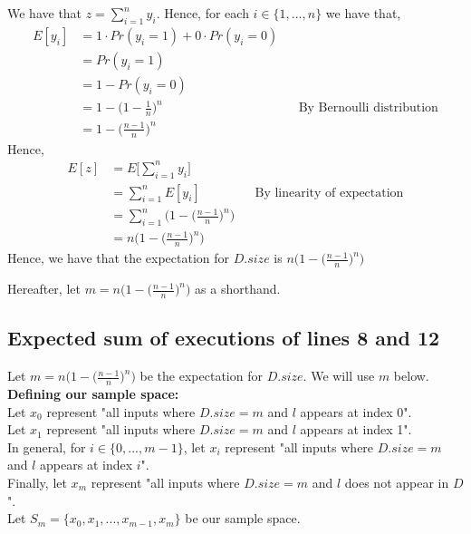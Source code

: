 \documentclass[12pt]{article}
\begin{document}
We have that $z = \sum\limits_{i=1}^n y_i$. Hence, for each $i \in \{1,...,n\}$ we have that,
\begin{align*}
E[y_i] &= 1 \cdot Pr(y_i = 1) + 0 \cdot Pr(y_i = 0) \\
&= Pr(y_i = 1) \\
&= 1 - Pr(y_i = 0) \\
&= 1 - \Big(1 - \frac{1}{n}\Big)^n &&\text{By Bernoulli distribution} \\
&= 1 - \Big(\frac{n-1}{n}\Big)^n
\end{align*}
Hence, 
\begin{align*}
E[z] &= E\Big[\sum_{i=1}^n y_i\Big] \\
&= \sum_{i=1}^n E[y_i] &&\text{By linearity of expectation} \\
&= \sum_{i=1}^n \Bigg(1 - \Big(\frac{n-1}{n}\Big)^n\Bigg) \\
&= n \Bigg(1 - \Big(\frac{n-1}{n}\Big)^n\Bigg) 
\end{align*}
Hence, we have that the expectation for $D.size$ is $n \Bigg(1 - \Big(\frac{n-1}{n}\Big)^n\Bigg) $

Hereafter, let $m = n \Bigg(1 - \Big(\frac{n-1}{n}\Big)^n\Bigg)$ as a shorthand. 

\subsection*{Expected sum of executions of lines 8 and 12}

Let $m = n \Bigg(1 - \Big(\frac{n-1}{n}\Big)^n\Bigg)$ be the expectation for $D.size$. We will use $m$ below. \\

\textbf{Defining our sample space:} \\

Let $x_0$ represent "all inputs where $D.size = m$ and $l$ appears at index 0". \\

Let $x_1$ represent "all inputs where $D.size = m$ and $l$ appears at index 1". \\

In general, for $i \in \{0,...,m-1\}$, let $x_{i}$ represent "all inputs where $D.size = m$ and $l$ appears at index $i$". \\

Finally, let $x_m$ represent "all inputs where $D.size = m$ and $l$ does not appear in $D$". \\

Let $S_m = \{x_0,x_1,...,x_{m-1},x_m\}$ be our sample space. \\
\end{document}
